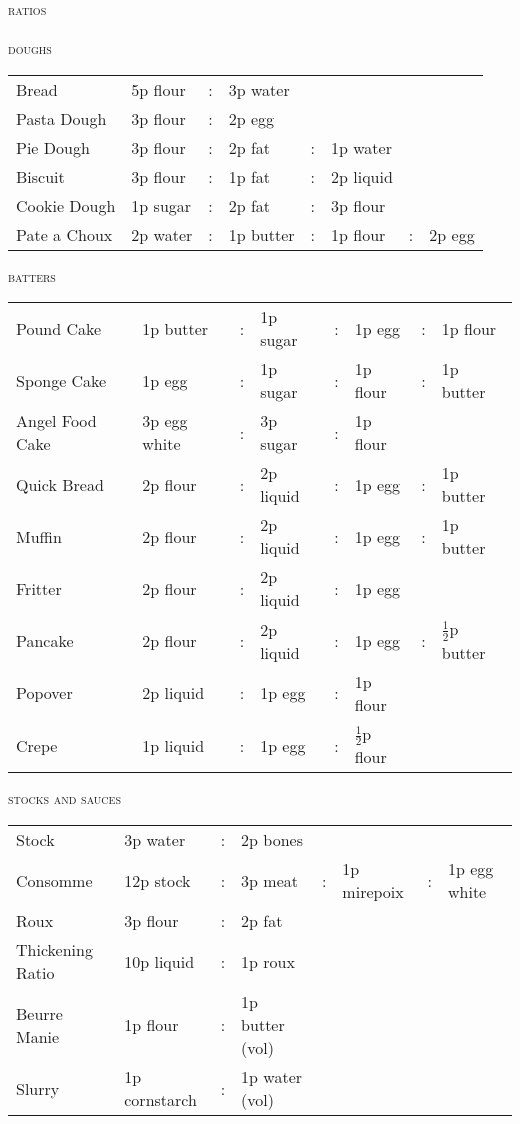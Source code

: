 \documentclass[letterpaper,11pt]{article}
\newcommand{\sectionheader}[1]{
    \vspace{0.5em}
    {\small\textsc{#1}} \\
    \vspace{1em}
}
\begin{document}
\normalsize

\pagestyle{empty}
{\huge\scshape{ratios}} \\
~ \\


\sectionheader{doughs}
{ \small
{}
\begin{tabularx}{\textwidth}{ p{4cm} X c X c X c X }
\cellcolor{gray!20}
Bread & 5p flour & : & 3p water & & & &  \\
Pasta Dough & 3p flour & : & 2p egg & & & & \\
\cellcolor{gray!20}
Pie Dough & 3p flour & : & 2p fat & : & 1p water & & \\
Biscuit & 3p flour & : & 1p fat & : & 2p liquid & & \\
\cellcolor{gray!20}
Cookie Dough & 1p sugar& : & 2p fat & : & 3p flour & & \\
Pate a Choux & 2p water & : & 1p butter & : & 1p flour & : & 2p egg \\
\end{tabularx}
}


\sectionheader{batters}
{ \small
{}
\begin{tabularx}{\textwidth}{ p{4cm} X c X c X c X }
\cellcolor{gray!20}
Pound Cake & 1p butter & : & 1p sugar & : & 1p egg & : & 1p flour \\
Sponge Cake & 1p egg & : & 1p sugar & : & 1p flour & : & 1p butter \\
\cellcolor{gray!20}
Angel Food Cake & 3p egg white & : & 3p sugar & : & 1p flour & & \\
Quick Bread & 2p flour & : & 2p liquid & : & 1p egg & : & 1p butter \\
\cellcolor{gray!20}
Muffin & 2p flour & : & 2p liquid & : & 1p egg & : & 1p butter \\
Fritter & 2p flour & : & 2p liquid & : & 1p egg & & \\
\cellcolor{gray!20}
Pancake & 2p flour & : & 2p liquid & : & 1p egg & : & $\frac{1}{2}$p butter \\
Popover & 2p liquid & : & 1p egg & : & 1p flour & & \\
\cellcolor{gray!20}
Crepe & 1p liquid & : & 1p egg & : & $\frac{1}{2}$p flour & & \\
\end{tabularx}
}

\sectionheader{stocks and sauces}
{ \small
{}
\begin{tabularx}{\textwidth}{ p{4cm} X c X c X c X }
\cellcolor{gray!20}
Stock & 3p water & : & 2p bones & & & & \\
Consomme & 12p stock & : & 3p meat & : & 1p mirepoix & : & 1p egg white \\
\cellcolor{gray!20}
Roux & 3p flour & : & 2p fat & & & & \\
Thickening Ratio & 10p liquid & : & 1p roux & & & & \\
\cellcolor{gray!20}
Beurre Manie & 1p flour & : & 1p butter (vol) & & & & \\
Slurry & 1p cornstarch & : & 1p water (vol) & & & & \\
\end{tabularx}
}
\end{document}
